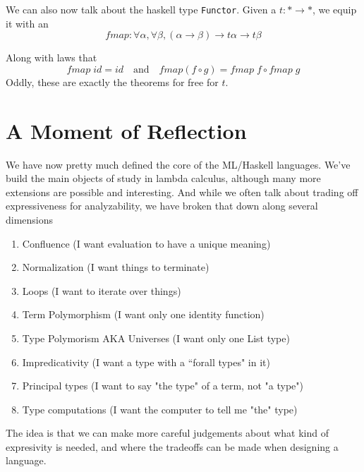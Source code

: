 \documentclass[12pt]{article}
\newcommand{\hask}{\texttt}
\begin{document}
We can also now talk about the haskell type \hask{Functor}.
Given a $t : * \rightarrow *$, we equip it with an 
\[
  fmap : \forall \alpha, \forall \beta, (\alpha \rightarrow \beta) \rightarrow t \alpha \rightarrow t\beta
\]

Along with laws that 
\[
   fmap\; id = id\quad\text{and}\quad fmap (f \circ g) = fmap\; f \circ fmap\; g
\]
Oddly, these are exactly the theorems for free for $t$. 
\section{A Moment of Reflection}
We have now pretty much defined the core of the ML/Haskell languages.
We've build the main objects of study in lambda calculus, although many more extensions are possible and interesting. 
And while we often talk about trading off expressiveness for analyzability, we have broken that down along several dimensions
\begin{enumerate}
    \item Confluence (I want evaluation to have a unique meaning)
    \item Normalization (I want things to terminate)
    \item Loops (I want to iterate over things)
    \item Term Polymorphism (I want only one identity function)
    \item Type Polymorism AKA Universes (I want only one List type)
    \item Impredicativity (I want a type with a ``forall types" in it)
    \item Principal types (I want to say "the type" of a term, not "a type")
    \item Type computations (I want the computer to tell me "the" type)
\end{enumerate}
The idea is that we can make more careful judgements about what kind of expresivity is needed, and where the tradeoffs can be made when designing a language.
\end{document}
